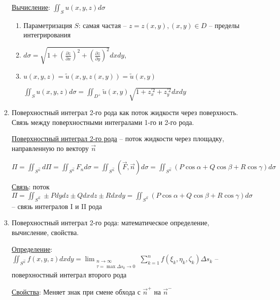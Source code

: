 \documentclass[12pt]{article}
\begin{document}
\begin{enumerate}
        \hyperlink{surfaceintegraloffirstkindcalculation}{Вычисление}: $\iint_S u(x, y, z) d\sigma$

        \begin{enumerate}
            \item Параметризация $S$: самая частая -- $z = z(x, y), (x, y) \in D$ -- пределы интегрирования

            \item $d\sigma = \sqrt{1 + \left(\frac{\partial z}{\partial x}\right)^2 + \left(\frac{\partial z}{\partial y}\right)^2} dxdy$,

            \item $u(x, y, z) = \tilde{u}(x, y, z(x, y)) = \tilde{u}(x, y)$

            $\iint_S u(x, y, z) d\sigma = \iint_{D^+} \tilde{u}(x, y) \sqrt{1 + z_x^{\prime 2} + z_y^{\prime 2}} dxdy$
        \end{enumerate}


        \item Поверхностный интеграл 2-го рода как поток жидкости через поверхность. Связь между поверхностными интегралами 1-го и 2-го рода.

        \hyperlink{surfaceintegralofsecondkind}{Поверхностный интеграл 2-го рода} -- поток жидкости через площадку, направленную по вектору $\vec{n}$

        $\Pi = \iint_{S^{\vec{n}}} d\Pi = \iint_{S^{\vec{n}}} F_n d\sigma = \iint_{S^{\vec{n}}} (\vec{F}, \vec{n})d\sigma = \iint_{S^{\vec{n}}} (P\cos\alpha + Q\cos\beta + R\cos\gamma)d\sigma$

        \hyperlink{connectionbetweensurfaceintegral}{Связь}: поток $\Pi = \iint_{S^{\vec{n}}} \pm Pdydz \pm Qdxdz \pm Rdxdy = \iint_{S^{\vec{n}}} (P\cos\alpha + Q\cos\beta + R\cos\gamma) d\sigma$ -- связь интегралов I и II рода

        \item Поверхностный интеграл 2-го рода: математическое определение, вычисление, свойства.

        \hyperlink{surfaceintegralofsecondkindmath}{Определение}: $\iint_{S^{\vec{n}}} f(x, y, z) dxdy = \lim_{\substack{n \to \infty \\ \tau = \max \Delta s_k \to 0}} \sum_{k=1}^n f(\xi_k, \eta_k, \zeta_k) \Delta s_k$ -- поверхностный интеграл второго рода

        \hyperlink{surfaceintegralofsecondkindproperties}{Свойства}: Меняет знак при смене обхода с $\vec{n}^+$ на $\vec{n}^-$


\end{enumerate}
\end{document}
